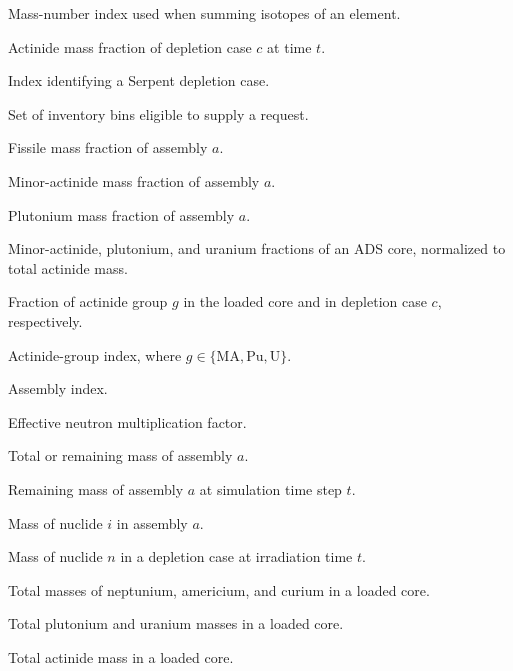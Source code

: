 \begin{symbollist}[1.55in]

\item[\(i\)] Mass-number index used when summing isotopes of an element.
\item[\(a_c(t)\)] Actinide mass fraction of depletion case \(c\) at time \(t\).
\item[\(c\)] Index identifying a Serpent depletion case.
\item[\(\mathcal{E}\)] Set of inventory bins eligible to supply a request.
\item[\(f_{\mathrm{fissile},a}\)] Fissile mass fraction of assembly \(a\).
\item[\(f_{\mathrm{MA},a}\)] Minor-actinide mass fraction of assembly \(a\).
\item[\(f_{\mathrm{Pu},a}\)] Plutonium mass fraction of assembly \(a\).
\item[\(f_{\mathrm{MA}}, f_{\mathrm{Pu}}, f_{\mathrm{U}}\)] Minor-actinide, plutonium, and uranium fractions of an ADS core, normalized to total actinide mass.
\item[\(f_g, f_{g,c}\)] Fraction of actinide group \(g\) in the loaded core and in depletion case \(c\), respectively.
\item[\(g\)] Actinide-group index, where \(g \in \{\mathrm{MA},\mathrm{Pu},\mathrm{U}\}\).
\item[\(a\)] Assembly index.
\item[\(k_{\mathrm{eff}}\)] Effective neutron multiplication factor.
\item[\(m_a\)] Total or remaining mass of assembly \(a\).
\item[\(m_{a,t}\)] Remaining mass of assembly \(a\) at simulation time step \(t\).
\item[\(m_{i,a}\)] Mass of nuclide \(i\) in assembly \(a\).
\item[\(m_n(t)\)] Mass of nuclide \(n\) in a depletion case at irradiation time \(t\).
\item[\(m_{\mathrm{Np}},m_{\mathrm{Am}},m_{\mathrm{Cm}}\)] Total masses of neptunium, americium, and curium in a loaded core.
\item[\(m_{\mathrm{Pu}},m_{\mathrm{U}}\)] Total plutonium and uranium masses in a loaded core.
\item[\(m_{\mathrm{act}}\)] Total actinide mass in a loaded core.

\end{symbollist}
